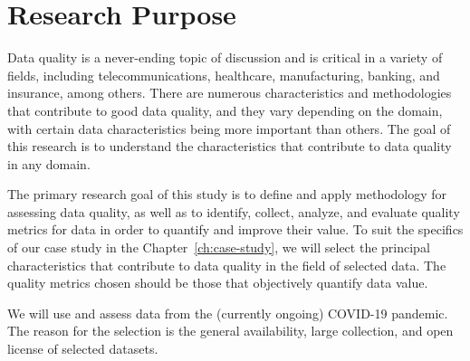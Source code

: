 \section*{Research Purpose}

Data quality is a never-ending topic of discussion and is critical in a variety of fields, including telecommunications, healthcare, manufacturing, banking, and insurance, among others.
There are numerous characteristics and methodologies that contribute to good data quality, and they vary depending on the domain, with certain data characteristics being more important than others.
The goal of this research is to understand the characteristics that contribute to data quality in any domain.

The primary research goal of this study is to define and apply methodology for assessing data quality, as well as to identify, collect, analyze, and evaluate quality metrics for data in order to quantify and improve their value.
To suit the specifics of our case study in the Chapter~\ref{ch:case-study}, we will select the principal characteristics that contribute to data quality in the field of selected data.
The quality metrics chosen should be those that objectively quantify data value.

We will use and assess data from the (currently ongoing) COVID-19 pandemic.
The reason for the selection is the general availability, large collection, and open license of selected datasets.
